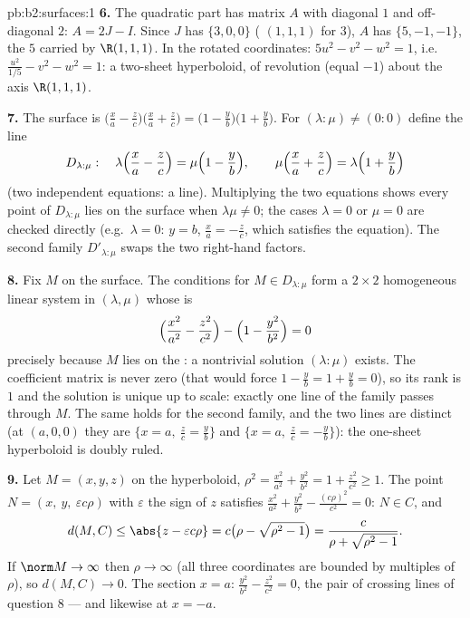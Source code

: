 \begin{solution}{pb:b2:surfaces:1}
\textbf{6.} The quadratic part has matrix $A$ with diagonal
$1$ and off-diagonal $2$: $A = 2J - I$. Since $J$ has 
$\{3, 0, 0\}$ ( $(1,1,1)$ for $3$), $A$ has
 $\{5, -1, -1\}$, the  $5$ carried by
$\R(1,1,1)$. In the rotated coordinates: $5u^2 - v^2 - w^2 =
1$, i.e.\ $\frac{u^2}{1/5} - v^2 - w^2 = 1$: a two-sheet
hyperboloid, of revolution (equal  $-1$) about the
axis $\R(1,1,1)$.

\textbf{7.} The surface is $\bigl(\frac xa - \frac
zc\bigr)\bigl(\frac xa + \frac zc\bigr) = \bigl(1 - \frac
yb\bigr)\bigl(1 + \frac yb\bigr)$. For $(\lambda : \mu) \neq
(0:0)$ define the line
\[
D_{\lambda:\mu} :\quad
\lambda\Bigl(\frac xa - \frac zc\Bigr) = \mu\Bigl(1 - \frac
yb\Bigr), \qquad
\mu\Bigl(\frac xa + \frac zc\Bigr) = \lambda\Bigl(1 + \frac
yb\Bigr)
\]
(two independent  equations: a line). Multiplying the
two equations shows every point of $D_{\lambda:\mu}$ lies on
the surface when $\lambda\mu \neq 0$; the cases $\lambda = 0$
or $\mu = 0$ are checked directly (e.g.\ $\lambda = 0$: $y =
b$, $\frac xa = -\frac zc$, which satisfies the equation). The
second family $D'_{\lambda:\mu}$ swaps the two right-hand
factors.

\textbf{8.} Fix $M$ on the surface. The conditions for $M \in
D_{\lambda:\mu}$ form a $2\times2$ homogeneous linear system
in $(\lambda, \mu)$ whose  is
\[
\Bigl(\frac{x^2}{a^2} - \frac{z^2}{c^2}\Bigr) - \Bigl(1 -
\frac{y^2}{b^2}\Bigr) = 0
\]
precisely because $M$ lies on the : a nontrivial
solution $(\lambda : \mu)$ exists. The coefficient matrix is
never zero (that would force $1 - \frac yb = 1 + \frac yb =
0$), so its rank is $1$ and the solution is unique up to
scale: exactly one line of the family passes through $M$.
The same holds for the second family, and the two lines are
distinct (at $(a, 0, 0)$ they are $\{x = a,\ \frac zc = \frac
yb\}$ and $\{x = a,\ \frac zc = -\frac yb\}$): the one-sheet
hyperboloid is doubly ruled.

\textbf{9.} Let $M = (x, y, z)$ on the hyperboloid, $\rho^2 =
\frac{x^2}{a^2} + \frac{y^2}{b^2} = 1 + \frac{z^2}{c^2} \geq
1$. The point $N = (x,\ y,\ \varepsilon c\rho)$ with
$\varepsilon$ the sign of $z$ satisfies $\frac{x^2}{a^2} +
\frac{y^2}{b^2} - \frac{(c\rho)^2}{c^2} = 0$: $N \in C$, and
\[
d(M, C) \leq \abs{z - \varepsilon c\rho}
= c\bigl(\rho - \sqrt{\rho^2 - 1}\bigr)
= \frac{c}{\rho + \sqrt{\rho^2 - 1}} .
\]
If $\norm M \to \infty$ then $\rho \to \infty$ (all three
coordinates are bounded by multiples of $\rho$), so $d(M, C)
\to 0$. The section $x = a$: $\frac{y^2}{b^2} -
\frac{z^2}{c^2} = 0$, the pair of crossing lines of question
8 --- and likewise at $x = -a$.


\end{solution}
